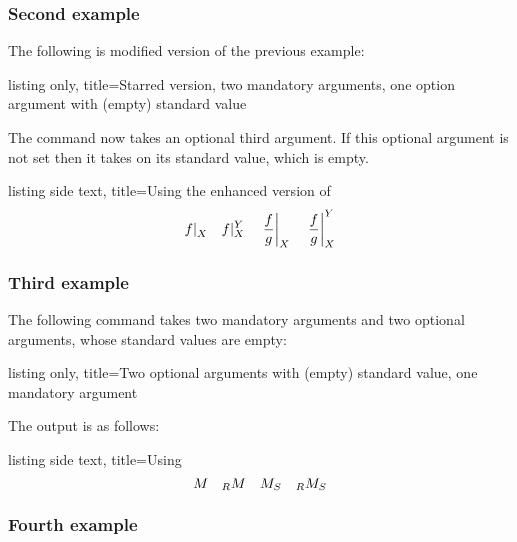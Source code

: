 \documentclass[a4paper, 10pt, headings=standardclasses, oneside, bibliography=totocnumbered]{scrbook}
\begin{document}
\subsubsection{Second example}

The following is modified version of the previous example:
\begin{tcblisting}{listing only, title={Starred version, two mandatory arguments, one option argument with (empty) standard value}}
\end{tcblisting}
The command now takes an optional third argument.
If this optional argument is not set then it takes on its standard value, which is empty.
\begin{tcblisting}{listing side text, title={Using the enhanced version of }}
\[
  \restrict{f}{X}
  \quad
  \restrict{f}{X}[Y]
  \quad
  \restrict*{\frac{f}{g}}{X}
  \quad
  \restrict*{\frac{f}{g}}{X}[Y]
\]
\end{tcblisting}

\subsubsection{Third example}

The following command takes two mandatory arguments and two optional arguments, whose standard values are empty:
\begin{tcblisting}{listing only, title={Two optional arguments with (empty) standard value, one mandatory argument}}
\end{tcblisting}
The output is as follows:
\begin{tcblisting}{listing side text, title={Using }}
\[
  \moduleindex{M}
  \quad
  \moduleindex[R]{M}
  \quad
  \moduleindex{M}[S]
  \quad
  \moduleindex[R]{M}[S]
\]
\end{tcblisting}

\subsubsection{Fourth example}
\end{document}
